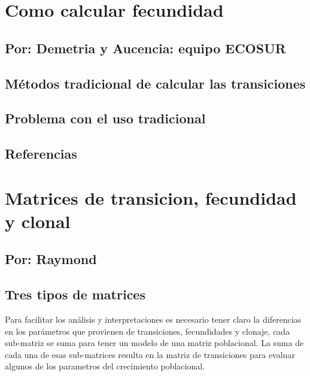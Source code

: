 \documentclass[
]{book}
\theoremstyle{definition}
\theoremstyle{definition}
\theoremstyle{definition}
\theoremstyle{definition}
\theoremstyle{remark}
\begin{document}
\chapter{Como calcular fecundidad}\label{como-calcular-fecundidad}

\section{Por: Demetria y Aucencia: equipo ECOSUR}\label{por-demetria-y-aucencia-equipo-ecosur}

\section{Métodos tradicional de calcular las transiciones}\label{muxe9todos-tradicional-de-calcular-las-transiciones-1}

\section{Problema con el uso tradicional}\label{problema-con-el-uso-tradicional}

\section{Referencias}\label{referencias-2}

\chapter{Matrices de transicion, fecundidad y clonal}\label{Fertilidad}

\section{Por: Raymond}\label{por-raymond}

\section{Tres tipos de matrices}\label{tres-tipos-de-matrices}

Para facilitar los análisis y interpretaciones es necesario tener claro la diferencias en los parámetros que provienen de transiciones, fecundidades y clonaje, cada sub-matriz se suma para tener un modelo de una matriz poblacional. La suma de cada una de esas sub-matrices resulta en la matriz de transiciones para evaluar algunos de los parametros del crecimiento poblacional.
\end{document}
